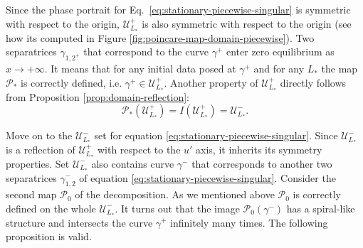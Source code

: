 Since the phase portrait for Eq.~\eqref{eq:stationary-piecewise-singular} is symmetric with respect to the origin, $\mathscr{U}_{L_*}^+$ is also symmetric with respect to the origin (see how its computed in Figure \ref{fig:poincare-map-domain-piecewise}).
Two separatrices $\gamma_{1,2^+}$ that correspond to the curve $\gamma^+$ enter zero equilibrium as $x \to +\infty$.
It means that for any initial data posed at $\gamma^+$ and for any $L_*$ the map $\mathcal{P}_*$ is correctly defined, i.e. $\gamma^+ \in \mathscr{U}_{L_*}^+$.
Another property of $\mathscr{U}_{L_*}^+$ directly follows from Proposition \ref{prop:domain-reflection}:
\begin{equation}
	\mathcal{P}_*(\mathscr{U}_{L_*}^+) = I (\mathscr{U}_{L_*}^+) = \mathscr{U}_{L_*}^-.
\label{eq:domain-reflection-singular-forward}
\end{equation}

Move on to the $\mathscr{U}_{L_*}^-$ set for equation \eqref{eq:stationary-piecewise-singular}.
Since $\mathscr{U}_{L_*}^-$ is a reflection of $\mathscr{U}_{L_*}^+$ with respect to the $u'$ axis, it inherits its symmetry properties.
Set $\mathscr{U}_{L_*}^-$ also contains curve $\gamma^-$ that corresponds to another two separatrices $\gamma_{1,2}^-$ of equation \eqref{eq:stationary-piecewise-singular}.
Consider the second map $\mathcal{P}_0$ of the decomposition.
As we mentioned above $\mathcal{P}_0$ is correctly defined on the whole $\mathscr{U}_{L_*}^-$.
It turns out that the image $\mathcal{P}_0(\gamma^-)$ has a spiral-like structure and intersects the curve $\gamma^+$ infinitely many times.
The following proposition is valid.

